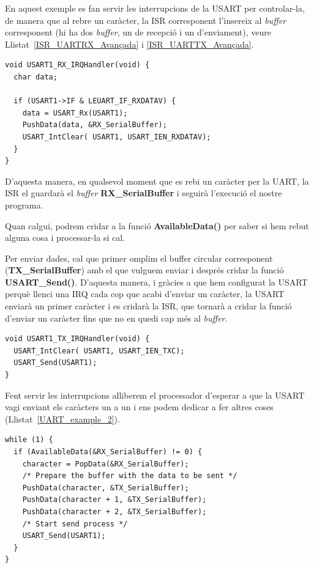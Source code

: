 En aquest exemple es fan servir les interrupcions de la USART per controlar-la, de manera que al rebre un caràcter, la \gls{ISR} corresponent l'insereix al {\em buffer} corresponent (hi ha dos {\em buffer}, un de recepció i un d'enviament), veure Llistat~\ref{ISR_UARTRX_Avançada} i \ref{ISR_UARTTX_Avançada}.
\begin{lstlisting}[style=customc,label=ISR_UARTRX_Avançada,caption=Exemple ISR avançada]
void USART1_RX_IRQHandler(void) {
  char data;

  if (USART1->IF & LEUART_IF_RXDATAV) {
    data = USART_Rx(USART1);
    PushData(data, &RX_SerialBuffer);
    USART_IntClear( USART1, USART_IEN_RXDATAV);
  }
}
\end{lstlisting}

D'aquesta manera, en qualsevol moment que es rebi un caràcter per la UART, la \gls{ISR} el guardarà el {\em buffer} {\bf RX\_SerialBuffer} i seguirà l'execució el nostre programa.

Quan calgui, podrem cridar a la funció {\bf AvailableData()} per saber si hem rebut alguna cosa i processar-la si cal.

Per enviar dades, cal que primer omplim el \gls{buffer circular} corresponent ({\bf TX\_SerialBuffer}) amb el que vulguem enviar i després cridar la funció {\bf USART\_Send()}. D'aquesta manera, i gràcies a que hem configurat la USART perquè llenci una \gls{IRQ} cada cop que acabi d'enviar un caràcter, la USART enviarà un primer caràcter i es cridarà la ISR, que tornarà a cridar la funció d'enviar un caràcter fins que no en quedi cap més al {\em buffer}.

\begin{lstlisting}[style=customc,label=ISR_UARTTX_Avançada,caption=Exemple ISR avançada]
void USART1_TX_IRQHandler(void) {
  USART_IntClear( USART1, USART_IEN_TXC);
  USART_Send(USART1);
}
\end{lstlisting}

Fent servir les interrupcions alliberem el processador d'esperar a que la USART vagi enviant els caràcters un a un i ens podem dedicar a fer altres coses (Llistat~\ref{UART_example_2}).

\begin{lstlisting}[style=customc,label=UART_example_2,caption=Funció main]
while (1) {
  if (AvailableData(&RX_SerialBuffer) != 0) {
    character = PopData(&RX_SerialBuffer);
    /* Prepare the buffer with the data to be sent */
    PushData(character, &TX_SerialBuffer);
    PushData(character + 1, &TX_SerialBuffer);
    PushData(character + 2, &TX_SerialBuffer);
    /* Start send process */
    USART_Send(USART1);
  }
}
\end{lstlisting}


